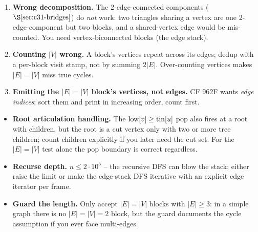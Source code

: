 \begin{warningbox}
\begin{enumerate}[nosep,leftmargin=1.6em]
  \item \textbf{Wrong decomposition.} The 2-edge-connected components
        (\(\secref{c31-bridges}\)) do \emph{not} work: two triangles sharing a vertex are
        one 2-edge-component but two blocks, and a shared-vertex edge would be mis-counted.
        You need vertex-biconnected blocks (the edge stack).
  \item \textbf{Counting \(|V|\) wrong.} A block's vertices repeat across its edges;
        dedup with a per-block visit stamp, not by summing \(2|E|\).  Over-counting
        vertices makes \(|E|=|V|\) miss true cycles.
  \item \textbf{Emitting the \(|E|=|V|\) block's vertices, not edges.} CF 962F wants
        \emph{edge indices}; sort them and print in increasing order, count first.
\end{enumerate}
\end{warningbox}

\begin{hardeningbox}
\begin{itemize}[nosep,leftmargin=1.4em]
  \item \textbf{Root articulation handling.} The \(\mathrm{low}[v]\ge\operatorname{tin}[u]\) pop also
        fires at a root with children, but the root is a cut vertex only with two or more
        tree children; count children explicitly if you later need the cut set.  For the
        \(|E|=|V|\) test alone the pop boundary is correct regardless.
  \item \textbf{Recurse depth.} \(n\le2\cdot10^5\) -- the recursive DFS can blow the
        stack; either raise the limit or make the edge-stack DFS iterative with an
        explicit edge iterator per frame.
  \item \textbf{Guard the length.} Only accept \(|E|=|V|\) blocks with \(|E|\ge3\): in a
        simple graph there is no \(|E|=|V|=2\) block, but the guard documents the cycle
        assumption if you ever face multi-edges.
\end{itemize}
\end{hardeningbox}

